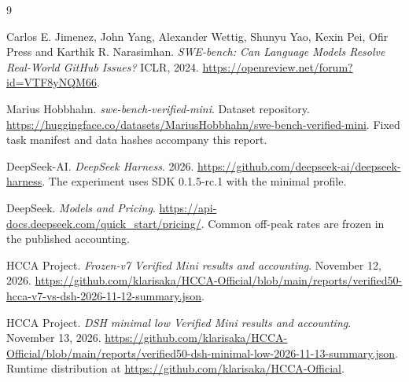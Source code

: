 \documentclass[10pt,a4paper]{article}
\begin{document}
\begin{thebibliography}{9}
\small
\raggedright
{}
Carlos E. Jimenez, John Yang, Alexander Wettig, Shunyu Yao, Kexin Pei,
Ofir Press and Karthik R. Narasimhan.
\emph{SWE-bench\textup{:} Can Language Models Resolve Real-World GitHub Issues?}
ICLR, 2024. \url{https://openreview.net/forum?id=VTF8yNQM66}.

Marius Hobbhahn. \emph{swe-bench-verified-mini}. Dataset repository.
\url{https://huggingface.co/datasets/MariusHobbhahn/swe-bench-verified-mini}.
Fixed task manifest and data hashes accompany this report.

DeepSeek-AI. \emph{DeepSeek Harness}. 2026.
\url{https://github.com/deepseek-ai/deepseek-harness}.
The experiment uses SDK 0.1.5-rc.1 with the minimal profile.

DeepSeek. \emph{Models and Pricing}.
\url{https://api-docs.deepseek.com/quick_start/pricing/}.
Common off-peak rates are frozen in the published accounting.

HCCA Project. \emph{Frozen-v7 Verified Mini results and accounting}.
November 12, 2026.
\url{https://github.com/klarisaka/HCCA-Official/blob/main/reports/verified50-hcca-v7-vs-dsh-2026-11-12-summary.json}.

HCCA Project. \emph{DSH minimal low Verified Mini results and accounting}.
November 13, 2026.
\url{https://github.com/klarisaka/HCCA-Official/blob/main/reports/verified50-dsh-minimal-low-2026-11-13-summary.json}.
Runtime distribution at \url{https://github.com/klarisaka/HCCA-Official}.
\end{thebibliography}
\end{document}
